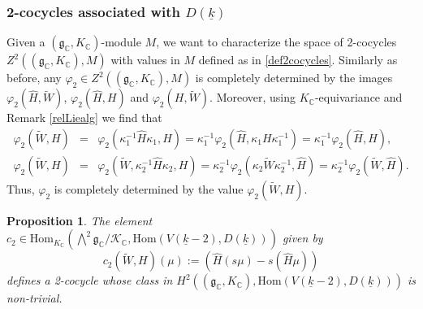 \documentclass{amsart}
\newtheorem{proposition}[theorem]{Proposition}
\theoremstyle{definition}
\theoremstyle{remark}
\numberwithin{equation}{section}
\newcommand{\C}{{\mathbb C}}
\newcommand{\cK}{{\mathcal K}}
\newcommand{\mfg}{{\mathfrak g}}
\newcommand{\Hom}{{\mathrm {Hom}}}
\begin{document}
\subsubsection{2-cocycles associated with $D(\underline{k})$} Given a $(\mfg_\C,K_\C)$-module $M$, we want to characterize the space of 2-cocycles $Z^2((\mfg_\C,K_\C),M)$ with values in $M$ defined as in \eqref{def2cocycles}.
Similarly as before, any $\varphi_2\in Z^2((\mfg_\C,K_\C),M)$ is completely determined by the images $\varphi_2(\hat H,\tilde W)$, $\varphi_2(\hat H,H)$ and $\varphi_2(H,\tilde W)$. Moreover, using $K_\C$-equivariance and Remark \ref{relLiealg} we find that
\begin{eqnarray*}
   \varphi_2(\tilde W,H)&=&\varphi_2(\kappa_1^{-1}\hat H\kappa_1,H)=\kappa_1^{-1}\varphi_2(\hat H,\kappa_1H\kappa_1^{-1})=\kappa_1^{-1}\varphi_2(\hat H,H),\\
   \varphi_2(\tilde W,H)&=&\varphi_2(\tilde W,\kappa_2^{-1}\hat H\kappa_2,H)=\kappa_2^{-1}\varphi_2(\kappa_2\tilde W\kappa_2^{-1},\hat H)=\kappa_2^{-1}\varphi_2(\tilde W,\hat H).
\end{eqnarray*}
Thus, $\varphi_2$ is completely determined by the value $\varphi_2(\tilde W,H)$. 
\begin{proposition}\label{propdefc2}
    The element
$c_2\in \Hom_{K_\C}\left(\bigwedge^2\mfg_\C/\cK_\C,\Hom(V(\underline k-2),D({\underline k}))\right)$ given by
\[
c_2(\tilde W,H)(\mu):=\left(\hat H(s\mu)-s(\hat H\mu)\right)
\]
defines a 2-cocycle  whose class in $H^2\left((\mfg_\C,K_\C),\Hom(V(\underline k-2),D({\underline k}))\right)$ is non-trivial.
\end{proposition}
\end{document}
